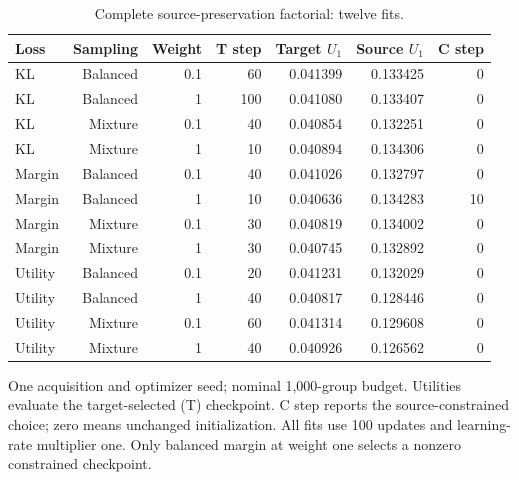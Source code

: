 \begin{table}[htbp]
\centering\small
\caption{Complete source-preservation factorial: twelve fits.}
\label{tab:preservationgrid}
\begin{tabular}{lrrrrrr}
\toprule
Loss & Sampling & Weight & T step & Target $U_1$ & Source $U_1$ & C step \\
\midrule
KL & Balanced & 0.1 & 60 & 0.041399 & 0.133425 & 0 \\
KL & Balanced & 1 & 100 & 0.041080 & 0.133407 & 0 \\
KL & Mixture & 0.1 & 40 & 0.040854 & 0.132251 & 0 \\
KL & Mixture & 1 & 10 & 0.040894 & 0.134306 & 0 \\
Margin & Balanced & 0.1 & 40 & 0.041026 & 0.132797 & 0 \\
Margin & Balanced & 1 & 10 & 0.040636 & 0.134283 & 10 \\
Margin & Mixture & 0.1 & 30 & 0.040819 & 0.134002 & 0 \\
Margin & Mixture & 1 & 30 & 0.040745 & 0.132892 & 0 \\
Utility & Balanced & 0.1 & 20 & 0.041231 & 0.132029 & 0 \\
Utility & Balanced & 1 & 40 & 0.040817 & 0.128446 & 0 \\
Utility & Mixture & 0.1 & 60 & 0.041314 & 0.129608 & 0 \\
Utility & Mixture & 1 & 40 & 0.040926 & 0.126562 & 0 \\
\bottomrule
\end{tabular}
\par\smallskip
\begin{minipage}{\linewidth}\footnotesize One acquisition and optimizer seed; nominal 1,000-group budget. Utilities evaluate the target-selected (T) checkpoint. C step reports the source-constrained choice; zero means unchanged initialization. All fits use 100 updates and learning-rate multiplier one. Only balanced margin at weight one selects a nonzero constrained checkpoint.\end{minipage}
\end{table}

